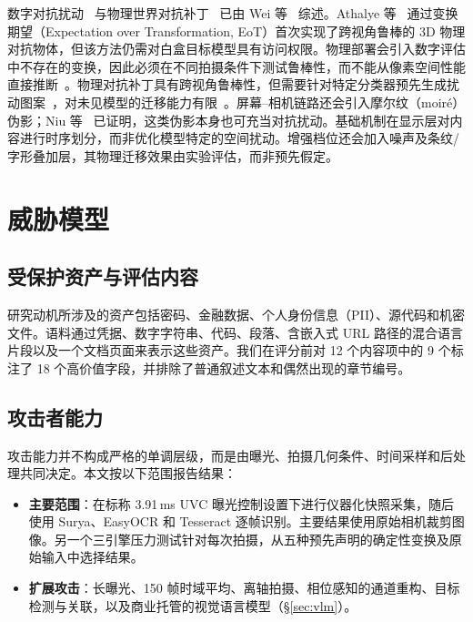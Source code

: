 \documentclass{ieeeaccess}
\begin{document}
数字对抗扰动~\cite{b_goodfellow2015,b_madry2018,b_carlini2017} 与物理世界对抗补丁~\cite{b_eykholt2018,b_thys2019,b_xu2020} 已由 Wei 等~\cite{b_wei2024} 综述。Athalye 等~\cite{b_athalye2018} 通过变换期望（Expectation over Transformation, EoT）首次实现了跨视角鲁棒的 3D 物理对抗物体，但该方法仍需对白盒目标模型具有访问权限。物理部署会引入数字评估中不存在的变换，因此必须在不同拍摄条件下测试鲁棒性，而不能从像素空间性能直接推断~\cite{b_eykholt2018}。物理对抗补丁具有跨视角鲁棒性，但需要针对特定分类器预先生成扰动图案~\cite{b_thys2019,b_xu2020}，对未见模型的迁移能力有限~\cite{b_gu2024}。屏幕--相机链路还会引入摩尔纹（moir\'{e}）伪影；Niu 等~\cite{b_niu2021} 已证明，这类伪影本身也可充当对抗扰动。基础机制在显示层对内容进行时序划分，而非优化模型特定的空间扰动。增强档位还会加入噪声及条纹/字形叠加层，其物理迁移效果由实验评估，而非预先假定。


\section{威胁模型}
\label{sec:threat}

\subsection{受保护资产与评估内容}

研究动机所涉及的资产包括密码、金融数据、个人身份信息（PII）、源代码和机密文件。语料通过凭据、数字字符串、代码、段落、含嵌入式 URL 路径的混合语言片段以及一个文档页面来表示这些资产。我们在评分前对 12 个内容项中的 9 个标注了 18 个高价值字段，并排除了普通叙述文本和偶然出现的章节编号。

\subsection{攻击者能力}

攻击能力并不构成严格的单调层级，而是由曝光、拍摄几何条件、时间采样和后处理共同决定。本文按以下范围报告结果：
\begin{itemize}
\item \textbf{主要范围}：在标称 3.91\,ms UVC 曝光控制设置下进行仪器化快照采集，随后使用 Surya、EasyOCR 和 Tesseract 逐帧识别。主要结果使用原始相机裁剪图像。另一个三引擎压力测试针对每次拍摄，从五种预先声明的确定性变换及原始输入中选择结果。
\item \textbf{扩展攻击}：长曝光、150 帧时域平均、离轴拍摄、相位感知的通道重构、目标检测与关联，以及商业托管的视觉语言模型（\S\ref{sec:vlm}）。
\end{itemize}
\end{document}
